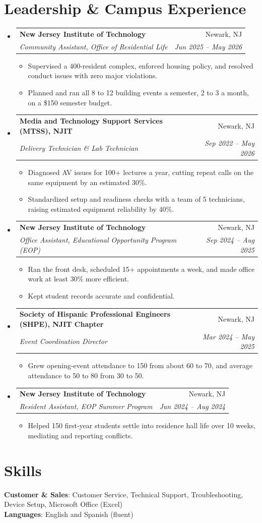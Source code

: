 \documentclass[letterpaper,11pt]{article}
\makeatletter
\newcommand{\resumeItem}[1]{\item\small{#1}}
\newcommand{\resumeSubheading}[4]{
  \vspace{-2pt}\item
    \begin{tabular*}{0.97\textwidth}[t]{l@{\extracolsep{\fill}}r}
      \textbf{#1} & #2 \\
      \textit{\small#3} & \textit{\small #4} \\
    \end{tabular*}\vspace{-7pt}
}
\newcommand{\resumeSubHeadingListStart}{\begin{itemize}[leftmargin=0.15in, label={}, itemsep=1pt, parsep=0pt, topsep=2pt]}
\newcommand{\resumeSubHeadingListEnd}{\end{itemize}}
\newcommand{\resumeItemListStart}{\begin{itemize}[topsep=6pt,itemsep=0pt,parsep=0pt,partopsep=0pt]}
\newcommand{\resumeItemListEnd}{\end{itemize}\vspace{-5pt}}
\makeatother
\begin{document}
\section{Leadership \& Campus Experience}
  \resumeSubHeadingListStart
    \resumeSubheading
      {New Jersey Institute of Technology}{Newark, NJ}
      {Community Assistant, Office of Residential Life}{Jun 2025 -- May 2026}
      \resumeItemListStart
        \resumeItem{Supervised a 400-resident complex, enforced housing policy, and resolved conduct issues with zero major violations.}
        \resumeItem{Planned and ran all 8 to 12 building events a semester, 2 to 3 a month, on a \$150 semester budget.}
      \resumeItemListEnd
    \resumeSubheading
      {Media and Technology Support Services (MTSS), NJIT}{Newark, NJ}
      {Delivery Technician \& Lab Technician}{Sep 2022 -- May 2026}
      \resumeItemListStart
        \resumeItem{Diagnosed AV issues for 100+ lectures a year, cutting repeat calls on the same equipment by an estimated 30\%.}
        \resumeItem{Standardized setup and readiness checks with a team of 5 technicians, raising estimated equipment reliability by 40\%.}
      \resumeItemListEnd
    \resumeSubheading
      {New Jersey Institute of Technology}{Newark, NJ}
      {Office Assistant, Educational Opportunity Program (EOP)}{Sep 2024 -- Aug 2025}
      \resumeItemListStart
        \resumeItem{Ran the front desk, scheduled 15+ appointments a week, and made office work at least 30\% more efficient.}
        \resumeItem{Kept student records accurate and confidential.}
      \resumeItemListEnd
    \resumeSubheading
      {Society of Hispanic Professional Engineers (SHPE), NJIT Chapter}{Newark, NJ}
      {Event Coordination Director}{Mar 2024 -- May 2025}
      \resumeItemListStart
        \resumeItem{Grew opening-event attendance to 150 from about 60 to 70, and average attendance to 50 to 80 from 30 to 50.}
      \resumeItemListEnd
    \resumeSubheading
      {New Jersey Institute of Technology}{Newark, NJ}
      {Resident Assistant, EOP Summer Program}{Jun 2024 -- Aug 2024}
      \resumeItemListStart
        \resumeItem{Helped 150 first-year students settle into residence hall life over 10 weeks, mediating and reporting conflicts.}
      \resumeItemListEnd
  \resumeSubHeadingListEnd

\section{Skills}
\begin{itemize}[leftmargin=0.15in, label={}]
    \small{\item{
      \textbf{Customer \& Sales}{: Customer Service, Technical Support, Troubleshooting, Device Setup, Microsoft Office (Excel)} \\
      \textbf{Languages}{: English and Spanish (fluent)}
    }}
\end{itemize}
\end{document}
